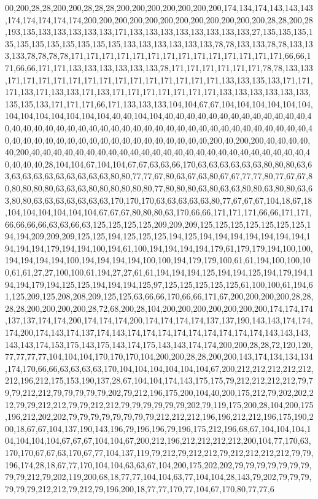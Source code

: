 00,200,28,28,200,200,28,28,28,200,200,200,200,200,200,200,174,134,174,143,143,143,174,174,174,174,174,200,200,200,200,200,200,200,200,200,200,200,200,28,28,200,28,193,135,133,133,133,133,133,171,133,133,133,133,133,133,133,133,27,135,135,135,135,135,135,135,135,135,135,135,133,133,133,133,133,133,78,78,133,133,78,78,133,133,133,78,78,78,78,171,171,171,171,171,171,171,171,171,171,171,171,171,171,66,66,171,66,66,171,171,133,133,133,133,133,133,78,171,171,171,171,171,171,78,78,133,133,171,171,171,171,171,171,171,171,171,171,171,171,171,171,133,133,135,133,171,171,171,133,171,133,133,171,133,171,171,171,171,171,171,171,133,133,133,133,133,133,135,135,133,171,171,171,66,171,133,133,133,104,104,67,67,104,104,104,104,104,104,104,104,104,104,104,104,104,40,40,104,104,40,40,40,40,40,40,40,40,40,40,40,40,40,40,40,40,40,40,40,40,40,40,40,40,40,40,40,40,40,40,40,40,40,40,40,40,40,40,40,40,40,40,40,40,40,40,40,40,40,40,40,40,40,40,40,40,40,40,40,40,200,40,200,200,40,40,40,40,40,200,40,40,40,40,40,40,40,40,40,40,40,40,40,40,40,40,40,40,40,40,40,40,40,40,40,40,40,40,40,28,104,104,67,104,104,67,67,63,63,66,170,63,63,63,63,63,63,80,80,80,63,63,63,63,63,63,63,63,63,63,63,80,80,77,77,67,80,63,67,63,80,67,67,77,77,80,77,67,67,80,80,80,80,80,63,63,63,80,80,80,80,80,80,77,80,80,80,63,80,63,63,80,80,63,80,80,63,63,80,80,63,63,63,63,63,63,63,170,170,170,63,63,63,63,63,80,77,67,67,67,104,18,67,18,104,104,104,104,104,104,67,67,67,80,80,80,63,170,66,66,171,171,171,66,66,171,171,66,66,66,66,63,63,66,63,125,125,125,125,209,209,209,125,125,125,125,125,125,125,194,194,209,209,209,125,125,194,125,125,125,194,125,194,194,194,194,194,194,194,194,194,194,179,194,194,100,194,61,100,194,194,194,194,179,61,179,179,194,100,100,194,194,194,194,100,194,194,194,194,100,100,194,179,179,100,61,61,194,100,100,100,61,61,27,27,100,100,61,194,27,27,61,61,194,194,194,125,194,194,125,194,179,194,194,194,179,194,125,125,194,194,194,125,97,125,125,125,125,125,61,100,100,61,194,61,125,209,125,208,208,209,125,125,63,66,66,170,66,66,171,67,200,200,200,200,28,28,28,28,200,200,200,200,28,72,68,200,28,104,200,200,200,200,200,200,200,174,174,174,137,137,174,174,200,174,174,174,200,174,174,174,174,137,137,190,143,143,174,174,174,200,174,143,174,137,174,143,174,174,174,174,174,174,174,174,174,143,143,143,143,143,174,153,175,143,175,143,174,175,143,143,174,174,200,200,28,28,72,120,120,77,77,77,77,104,104,104,170,170,170,104,200,200,28,28,200,200,143,174,134,134,134,174,170,66,66,63,63,63,63,170,104,104,104,104,104,104,67,200,212,212,212,212,212,212,196,212,175,153,190,137,28,67,104,104,174,143,175,175,79,212,212,212,212,79,79,79,212,212,79,79,79,79,79,202,79,212,196,175,200,104,40,200,175,212,79,202,202,212,79,79,212,212,79,79,212,212,79,79,79,79,79,79,202,79,119,175,200,28,104,200,175,196,212,202,202,79,79,79,79,79,79,79,79,212,212,212,196,196,212,212,196,175,190,200,18,67,67,104,137,190,143,196,79,196,196,79,196,175,212,196,68,67,104,104,104,104,104,104,104,67,67,67,104,104,67,200,212,196,212,212,212,212,200,104,77,170,63,170,170,67,67,63,170,67,77,104,137,119,79,212,79,212,212,79,212,212,212,212,79,79,196,174,28,18,67,77,170,104,104,63,63,67,104,200,175,202,202,79,79,79,79,79,79,79,79,79,212,79,202,119,200,68,18,77,77,104,104,63,77,104,104,28,143,79,202,79,79,79,79,79,79,212,212,79,212,79,196,200,18,77,77,170,77,104,67,170,80,77,77,6